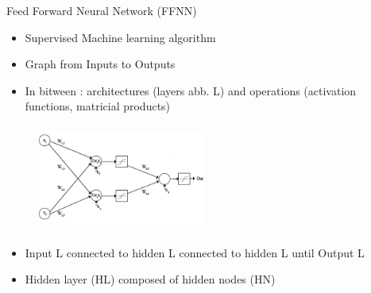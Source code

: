 \documentclass[10pt,
			   xcolor=svgnames,
			   hyperref={linkcolor=red, citecolor = DarkGreen, colorlinks=true, urlcolor=Navy}] {beamer}
\newcommand{\warrow}{\item[\color{blue!50!black!70} \tiny{\ding{109}}]}
\newcommand{\sarrow}{\item[\color{blue!50!black!70!orange!60} \tiny{\ding{55}}]}
\begin{document}
\begin{frame}{Feed Forward Neural Network (FFNN)}
		\begin{itemize}
			\warrow Supervised Machine learning algorithm
			\warrow Graph from Inputs to Outputs 
			\warrow In bitween : architectures (layers abb. L) and operations (activation functions, matricial products)
		\end{itemize}

	\begin{multicols}{2}
	\noindent 
	
	\begin{figure}[!ht]
		\centering
		\includegraphics[width=5.5cm, height=3.5cm]{Multi-layer-perceptron.png}	
	\end{figure}	
	
	\columnbreak

		\begin{itemize}
			\sarrow Input L connected to hidden L connected to hidden L until Output L
			\sarrow Hidden layer (HL) composed of hidden nodes (HN)			
		\end{itemize}	
	\end{multicols}

\end{frame}
\end{document}
